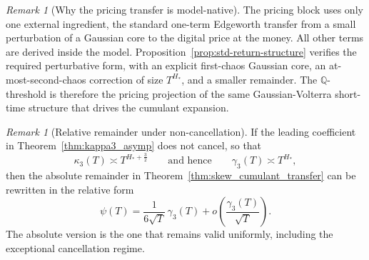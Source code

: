 \documentclass[11pt,a4paper]{amsart}
\theoremstyle{plain}
\theoremstyle{definition}
\theoremstyle{remark}
\newtheorem{remark}[theorem]{Remark}
\newcommand{\Q}{\mathbb{Q}}
\begin{document}
\begin{remark}[Why the pricing transfer is model-native]
The pricing block uses only one external ingredient, the standard one-term Edgeworth transfer from
a small perturbation of a Gaussian core to the digital price at the money.  All other terms are
derived inside the model.  Proposition~\ref{prop:std-return-structure} verifies the required
perturbative form, with an explicit first-chaos Gaussian core, an at-most-second-chaos correction
of size \(T^{H_*}\), and a smaller remainder.  The \(\Q\)-threshold is therefore the pricing
projection of the same Gaussian-Volterra short-time structure that drives the cumulant expansion.
\end{remark}

\begin{remark}[Relative remainder under non-cancellation]
If the leading coefficient in Theorem~\ref{thm:kappa3_asymp} does not cancel, so that
\[
\kappa_3(T)\asymp T^{H_*+\frac32}
\qquad\text{and hence}\qquad
\gamma_3(T)\asymp T^{H_*},
\]
then the absolute remainder in Theorem~\ref{thm:skew_cumulant_transfer} can be rewritten in the
relative form
\[
\psi(T)
=
\frac{1}{6\sqrt{T}}\,\gamma_3(T)
+
o\!\left(\frac{\gamma_3(T)}{\sqrt{T}}\right).
\]
The absolute version is the one that remains valid uniformly, including the exceptional
cancellation regime.
\end{remark}
\end{document}
